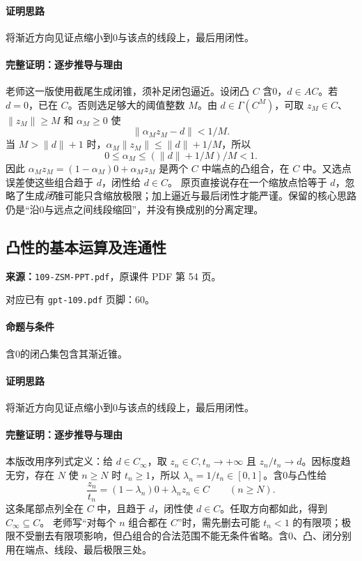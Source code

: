 \paragraph{证明思路}将渐近方向见证点缩小到0与该点的线段上，最后用闭性。
\paragraph{完整证明：逐步推导与理由}

老师这一版使用截尾生成闭锥，须补足闭包逼近。设闭凸 $C$ 含0，$d\in AC$。若 $d=0$，已在 $C$。否则选足够大的阈值整数 $M$。由 $d\in\Gamma(C^M)$，可取 $z_M\in C$、$\|z_M\|\ge M$ 和 $\alpha_M\ge0$ 使
\[\|\alpha_Mz_M-d\|<1/M.\]
当 $M>\|d\|+1$ 时，$\alpha_M\|z_M\|\le\|d\|+1/M$，所以
\[0\le\alpha_M\le(\|d\|+1/M)/M<1.\]
因此 $\alpha_Mz_M=(1-\alpha_M)0+\alpha_Mz_M$ 是两个 $C$ 中端点的凸组合，在 $C$ 中。又选点误差使这些组合趋于 $d$，闭性给 $d\in C$。
原页直接说存在一个缩放点恰等于 $d$，忽略了生成\emph{闭}锥可能只含缩放极限；加上逼近与最后闭性才能严谨。保留的核心思路仍是“沿0与远点之间线段缩回”，并没有换成别的分离定理。

\clearpage\subsection{凸性的基本运算及连通性}
\textbf{来源：}\texttt{109-ZSM-PPT.pdf}，原课件 PDF 第 54 页。\par
对应已有 \texttt{gpt-109.pdf} 页脚：60。\par
\paragraph{命题与条件}含0的闭凸集包含其渐近锥。
\paragraph{证明思路}将渐近方向见证点缩小到0与该点的线段上，最后用闭性。
\paragraph{完整证明：逐步推导与理由}

本版改用序列式定义：给 $d\in C_\infty$，取 $z_n\in C,t_n\to+\infty$ 且 $z_n/t_n\to d$。因标度趋无穷，存在 $N$ 使 $n\ge N$ 时 $t_n\ge1$，所以 $\lambda_n=1/t_n\in[0,1]$。含0与凸性给
\[\frac{z_n}{t_n}=(1-\lambda_n)0+\lambda_nz_n\in C\qquad(n\ge N).\]
这条尾部点列全在 $C$ 中，且趋于 $d$，闭性使 $d\in C$。任取方向都如此，得到 $C_\infty\subseteq C$。
老师写“对每个 $n$ 组合都在 $C$”时，需先删去可能 $t_n<1$ 的有限项；极限不受删去有限项影响，但凸组合的合法范围不能无条件省略。含0、凸、闭分别用在端点、线段、最后极限三处。

